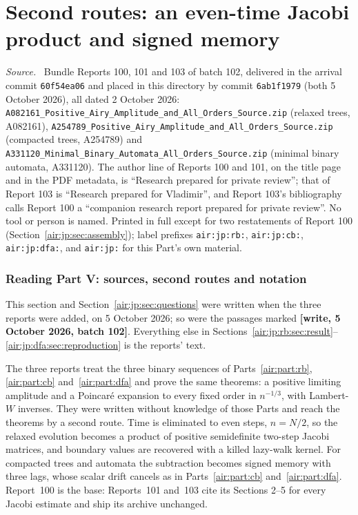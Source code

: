 \documentclass[11pt,letterpaper]{article}
\makeatletter
\numberwithin{equation}{section}
\theoremstyle{remark}
\newenvironment{partsource}{\par\medskip\noindent\begin{minipage}{\linewidth}\small\raggedright\textit{Source.}\ }{\end{minipage}\par\medskip}
\newcommand{\airwidertoc}{%
  \renewcommand*\l@section[2]{%
    \ifnum \c@tocdepth >\z@
      \addpenalty\@secpenalty
      \addvspace{1.0em \@plus\p@}%
      \setlength\@tempdima{2em}%
      \begingroup
        \parindent \z@ \rightskip \@pnumwidth
        \parfillskip -\@pnumwidth
        \leavevmode \bfseries
        \advance\leftskip\@tempdima
        \hskip -\leftskip
        ##1\nobreak\hfil
        \nobreak\hb@xt@\@pnumwidth{\hss ##2%
                                   \kern-\p@\kern\p@}\par
      \endgroup
    \fi}}
\newcommand{\repopath}[1]{\nolinkurl{#1}}
\makeatother
\begin{document}
\addtocontents{toc}{\protect\airwidertoc}
\part{Second routes: an even-time Jacobi product and signed memory}\label{air:part:jp}

\begin{partsource}
Bundle Reports 100, 101 and 103 of batch 102, delivered in the arrival commit \texttt{60f54ea06} and placed in this directory by commit \texttt{6ab1f1979} (both 5 October 2026), all dated 2 October 2026: \repopath{A082161_Positive_Airy_Amplitude_and_All_Orders_Source.zip} (relaxed trees, A082161), \repopath{A254789_Positive_Airy_Amplitude_and_All_Orders_Source.zip} (compacted trees, A254789) and \repopath{A331120_Minimal_Binary_Automata_All_Orders_Source.zip} (minimal binary automata, A331120). The author line of Reports 100 and 101, on the title page and in the PDF metadata, is ``Research prepared for private review''; that of Report 103 is ``Research prepared for Vladimir'', and Report 103's bibliography calls Report 100 a ``companion research report prepared for private review''. No tool or person is named. Printed in full except for two restatements of Report 100 (Section~\ref{air:jp:sec:assembly}); label prefixes \texttt{air:jp:rb:}, \texttt{air:jp:cb:}, \texttt{air:jp:dfa:}, and \texttt{air:jp:} for this Part's own material.
\end{partsource}

\section{Reading Part V: sources, second routes and notation}\label{air:jp:sec:guide}
This section and Section~\ref{air:jp:sec:questions} were written when the three reports were added, on 5 October 2026; so were the passages marked \textbf{[write, 5 October 2026, batch 102]}. Everything else in Sections~\ref{air:jp:rb:sec:result}--\ref{air:jp:dfa:sec:reproduction} is the reports' text.

The three reports treat the three binary sequences of Parts~\ref{air:part:rb}, \ref{air:part:cb} and~\ref{air:part:dfa} and prove the same theorems: a positive limiting amplitude and a Poincar\'e expansion to every fixed order in $n^{-1/3}$, with Lambert-$W$ inverses. They were written without knowledge of those Parts and reach the theorems by a second route. Time is eliminated to even steps, $n=N/2$, so the relaxed evolution becomes a product of positive semidefinite two-step Jacobi matrices, and boundary values are recovered with a killed lazy-walk kernel. For compacted trees and automata the subtraction becomes signed memory with three lags, whose scalar drift cancels as in Parts~\ref{air:part:cb} and~\ref{air:part:dfa}. Report~100 is the base: Reports~101 and~103 cite its Sections 2--5 for every Jacobi estimate and ship its archive unchanged.
\end{document}
